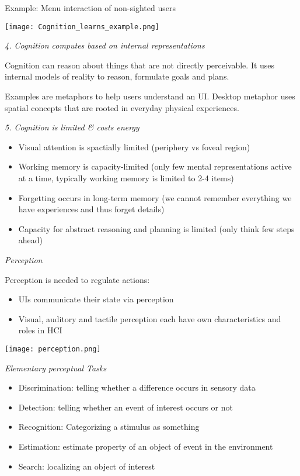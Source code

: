 Example: Menu interaction of non-sighted users
\begin{center}
	\texttt{[image: Cognition\_learns\_example.png]}
\end{center}


\textit{4. Cognition computes based on internal representations} \smallskip

 Cognition can reason about things that are not directly perceivable. It uses internal models of reality to reason, formulate goals and plans.

 Examples are metaphors to help users understand an UI. Desktop metaphor uses spatial concepts that are rooted in everyday physical experiences. 

\textit{5. Cognition is limited \& costs energy} \smallskip

\begin{itemize}[itemsep=-5pt, topsep=0pt, leftmargin=*]
	\item Visual attention is spactially limited (periphery vs foveal region)
	\item Working memory is capacity-limited (only few mental representations active at a time, typically working memory is limited to 2-4 items)
	\item Forgetting occurs in long-term memory (we cannot remember everything we have experiences and thus forget details)
	\item Capacity for abstract reasoning and planning is limited (only think few steps ahead)
\end{itemize}


\textit{Perception} \smallskip

Perception is needed to regulate actions:
\begin{itemize}[itemsep=-5pt, topsep=0pt, leftmargin=*]
	\item UIs communicate their state via perception
	\item Visual, auditory and tactile perception each have own characteristics and roles in HCI
\end{itemize}

\begin{center}
	\texttt{[image: perception.png]}
\end{center}


\textit{Elementary perceptual Tasks} \smallskip

\begin{itemize}[itemsep=-5pt, topsep=0pt, leftmargin=*]
	\item Discrimination: telling whether a difference occurs in sensory data
	\item Detection: telling whether an event of interest occurs or not
	\item Recognition: Categorizing a stimulus as something
	\item Estimation: estimate property of an object of event in the environment
	\item Search: localizing an object of interest
\end{itemize}

